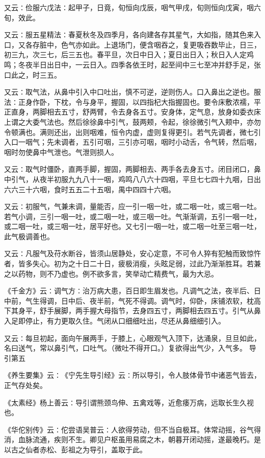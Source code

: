 \documentclass[a4paper,12pt,UTF8,twoside]{ctexbook}
\begin{document}
又云∶俭服六戊法∶起甲子，日竟，旬恒向戊辰，咽气甲戌，旬则恒向戊寅，咽六旬，效此。

又云∶服五星精法∶春夏秋冬及四季月，各向建各存其星气，大如指，随其色来入口，又各存脏中，色气亦如此。上退场门，便含咽吞之，复更吸吞数毕止，日三，初三九，次三七，后三五也。春平旦，次日中日入；夏日出日入；秋日入人定鸡鸣；冬夜半日出日中，一云日入。四季各依王时，起至间中三七至冲并舒手足，张口此之，时三五。

又云∶取气法，从鼻中引入中口吐出，慎不可逆，逆则伤人。口入鼻出之逆也。服法∶正身作卧，下枕，令与身平，握固，以四指杞大指握固也。要令床敷浓襦，平正直身，两脚相去五寸，舒两臂，令去身各五寸。安身体，定气息，放身如委衣床上谓之大委气法也。然后徐徐鼻中引气，鼓两颊，令起，徐徐微引气入颊中，亦勿令顿满也。满则还出，出则咽难，恒令内虚，虚则复得更引。若气先调者，微七引入口一咽气；先未调者，五引可咽，三引亦可咽，咽时小动舌，令气转，然后咽，咽时勿使鼻中气泄也。气泄则损人。

又云∶取气时僵卧，直两手脚，握固，两脚相去、两手各去身五寸。闭目闭口，鼻中引气，从夜半初服九九八十一咽，鸡鸣八八六十四咽，平旦七七四十九咽，日出六六三十六咽，食时五五二十五咽，禺中四四十六咽。

又云∶初服气，气兼未调，量能否，应一引一咽一吐，或二咽一吐，或三咽一吐。若气小调，三引一咽一吐，或二咽一吐，或三咽一吐。气渐渐调，五引一咽一吐，或二咽一吐，或三咽一吐，居平好也。又七引一咽一吐，或二咽一吐至三咽一吐，此气极调善也。

又云∶凡服气及苻水断谷，皆须山居静处，安心定意，不可令人猝有犯触而致惊忤者，皆多失心。初为之十日二十日，疲极消瘦，头眩足弱，过此乃渐渐胜耳。若兼之以药物，则不乃虚也。例不欲多言，笑举动亡精费气，最为大忌。

《千金方》云∶调气方∶治万病大患，百日即生眉发也。凡调气之法，夜半后、日中前，气生得调，日中后、夜半前，气死不得调。调气时，仰卧，床铺浓软，枕高下其身平，舒手展脚，两手握大母指节，去身四五寸，两脚相去四五寸。引气从鼻入足即停止，有力更取久住。气闭从口细细吐出，尽还从鼻细细引入。

又云∶每旦初起，面向午展两手，于膝上，心眼观气入顶下，达涌泉，旦旦如此，名曰送气，常以鼻引气，口吐气。（微吐不得开口。）复欲得出气少，入气多。
导引第五

《养生要集》云∶《宁先生导引经》云∶所以导引，令人肢体骨节中诸恶气皆去，正气存处矣。

《太素经》杨上善云∶导引谓熊颈鸟伸、五禽戏等，近愈痿万病，远取长生久视也。

《华佗别传》云∶佗尝语吴普云∶人欲得劳动，但不当自极耳。体常动摇，谷气得消，血脉流通，疾则不生。卿见户枢虽用易腐之木，朝暮开闭动摇，遂最晚朽。是以古之仙者赤松、彭祖之为导引，盖取于此。
\end{document}
